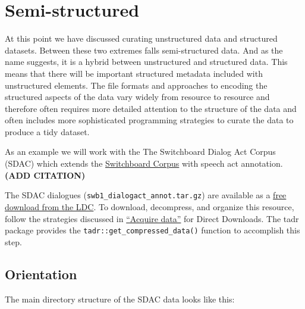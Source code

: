\documentclass[
  letterpaper,
]{latex/krantz}
\begin{document}
\hypertarget{semi-structured}{%
\section{Semi-structured}\label{semi-structured}}

At this point we have discussed curating unstructured data and
structured datasets. Between these two extremes falls semi-structured
data. And as the name suggests, it is a hybrid between unstructured and
structured data. This means that there will be important structured
metadata included with unstructured elements. The file formats and
approaches to encoding the structured aspects of the data vary widely
from resource to resource and therefore often requires more detailed
attention to the structure of the data and often includes more
sophisticated programming strategies to curate the data to produce a
tidy dataset.

As an example we will work with the The Switchboard Dialog Act Corpus
(SDAC) which extends the
\href{https://catalog.ldc.upenn.edu/LDC97S62}{Switchboard Corpus} with
speech act annotation. \textbf{(ADD CITATION)}

\begin{tcolorbox}[enhanced jigsaw, toprule=.15mm, bottomtitle=1mm, coltitle=black, title=\textcolor{quarto-callout-warning-color}{\faExclamationTriangle}\hspace{0.5em}{Tip}, left=2mm, colframe=quarto-callout-warning-color-frame, bottomrule=.15mm, colbacktitle=quarto-callout-warning-color!10!white, leftrule=.75mm, colback=white, titlerule=0mm, breakable, toptitle=1mm, opacityback=0, arc=.35mm, rightrule=.15mm, opacitybacktitle=0.6]

The SDAC dialogues (\texttt{swb1\_dialogact\_annot.tar.gz}) are
available as a \href{https://catalog.ldc.upenn.edu/docs/LDC97S62/}{free
download from the LDC}. To download, decompress, and organize this
resource, follow the strategies discussed in
\protect\hyperlink{acquire-data}{``Acquire data''} for Direct Downloads.
The tadr package provides the \texttt{tadr::get\_compressed\_data()}
function to accomplish this step.

\end{tcolorbox}

\hypertarget{orientation-2}{%
\subsection{Orientation}\label{orientation-2}}

The main directory structure of the SDAC data looks like this:
\end{document}
